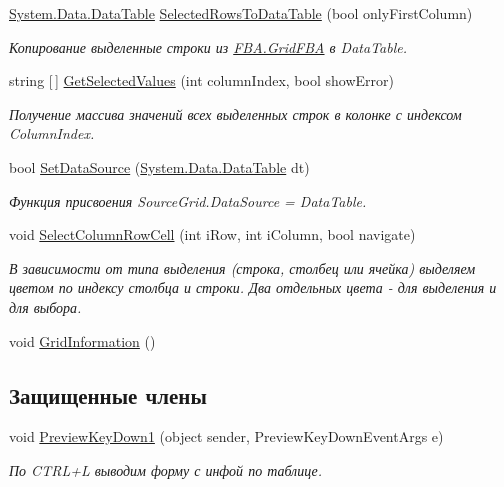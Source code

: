 \begin{DoxyCompactItemize}
\mbox{\hyperlink{_sys_static_8cs_a6542cfcff2f8e81f06ade15aa0bfe2b7}{System.\+Data.\+Data\+Table}} \mbox{\hyperlink{class_f_b_a_1_1_grid_f_b_a_aa68f0c933105dee7deaf07a06894e068}{Selected\+Rows\+To\+Data\+Table}} (bool only\+First\+Column)
\begin{DoxyCompactList}\small\item\em Копирование выделенные строки из \mbox{\hyperlink{class_f_b_a_1_1_grid_f_b_a}{F\+B\+A.\+Grid\+F\+BA}} в Data\+Table. \end{DoxyCompactList}\item 
string \mbox{[}$\,$\mbox{]} \mbox{\hyperlink{class_f_b_a_1_1_grid_f_b_a_a1d3c3a44ac6397c8872d8d7f96467821}{Get\+Selected\+Values}} (int column\+Index, bool show\+Error)
\begin{DoxyCompactList}\small\item\em Получение массива значений всех выделенных строк в колонке с индексом Column\+Index. \end{DoxyCompactList}\item 
bool \mbox{\hyperlink{class_f_b_a_1_1_grid_f_b_a_a45710c3e15371e24e202223b2d49c411}{Set\+Data\+Source}} (\mbox{\hyperlink{_sys_static_8cs_a6542cfcff2f8e81f06ade15aa0bfe2b7}{System.\+Data.\+Data\+Table}} dt)
\begin{DoxyCompactList}\small\item\em Функция присвоения Source\+Grid.\+Data\+Source = Data\+Table. \end{DoxyCompactList}\item 
void \mbox{\hyperlink{class_f_b_a_1_1_grid_f_b_a_ab72346f05acaea7bee8f9bd26811ff42}{Select\+Column\+Row\+Cell}} (int i\+Row, int i\+Column, bool navigate)
\begin{DoxyCompactList}\small\item\em В зависимости от типа выделения (строка, столбец или ячейка) выделяем цветом по индексу столбца и строки. Два отдельных цвета -\/ для выделения и для выбора. \end{DoxyCompactList}\item 
void \mbox{\hyperlink{class_f_b_a_1_1_grid_f_b_a_a675569672fd3cd42cb66cbefeba15611}{Grid\+Information}} ()
\end{DoxyCompactItemize}
\subsection*{Защищенные члены}
\begin{DoxyCompactItemize}
\item 
void \mbox{\hyperlink{class_f_b_a_1_1_grid_f_b_a_a0463f19d3f7bb46245cc928c088023e9}{Preview\+Key\+Down1}} (object sender, Preview\+Key\+Down\+Event\+Args e)
\begin{DoxyCompactList}\small\item\em По C\+T\+R\+L+L выводим форму с инфой по таблице. \end{DoxyCompactList}\end{DoxyCompactItemize}


